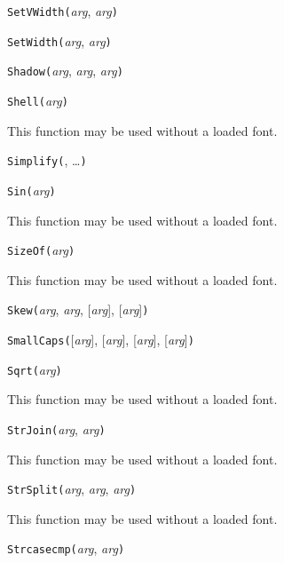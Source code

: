 
\noindent\texttt{SetVWidth(}\textit{arg}, \textit{arg}\texttt{)}


\noindent\texttt{SetWidth(}\textit{arg}, \textit{arg}\texttt{)}


\noindent\texttt{Shadow(}\textit{arg}, \textit{arg}, \textit{arg}\texttt{)}


\noindent\texttt{Shell(}\textit{arg}\texttt{)}

This function may be used without a loaded font.


\noindent\texttt{Simplify(}, \ldots\texttt{)}


\noindent\texttt{Sin(}\textit{arg}\texttt{)}

This function may be used without a loaded font.


\noindent\texttt{SizeOf(}\textit{arg}\texttt{)}

This function may be used without a loaded font.


\noindent\texttt{Skew(}\textit{arg}, \textit{arg}, [\textit{arg}], [\textit{arg}]\texttt{)}


\noindent\texttt{SmallCaps(}[\textit{arg}], [\textit{arg}], [\textit{arg}], [\textit{arg}]\texttt{)}


\noindent\texttt{Sqrt(}\textit{arg}\texttt{)}

This function may be used without a loaded font.


\noindent\texttt{StrJoin(}\textit{arg}, \textit{arg}\texttt{)}

This function may be used without a loaded font.


\noindent\texttt{StrSplit(}\textit{arg}, \textit{arg}, \textit{arg}\texttt{)}

This function may be used without a loaded font.


\noindent\texttt{Strcasecmp(}\textit{arg}, \textit{arg}\texttt{)}

